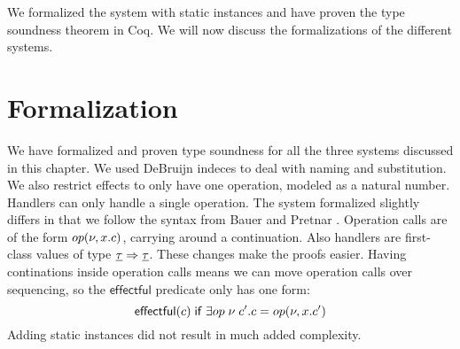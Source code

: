 {We formalized the system with static instances and have proven the type soundness theorem in Coq.
We will now discuss the formalizations of the different systems.

\section{Formalization}
\label{sec:formalization}

We have formalized and proven type soundness for all the three systems discussed in this chapter.
We used DeBruijn indeces to deal with naming and substitution.
We also restrict effects to only have one operation, modeled as a natural number.
Handlers can only handle a single operation.
The system formalized slightly differs in that we follow the syntax from Bauer and Pretnar \cite{eff2}.
Operation calls are of the form $op(\nu, x. c)$, carrying around a continuation.
Also handlers are first-class values of type $\underline{\tau} \Rightarrow \underline{\tau}$.
These changes make the proofs easier.
Having continations inside operation calls means we can move operation calls over sequencing, so the $\mathsf{effectful}$ predicate only has one form:
\[ \mathsf{effectful}(c) \;\mathsf{if}\; \exists op \; \nu \; c'. c = op(\nu, x. c') \]
Adding static instances did not result in much added complexity.
}